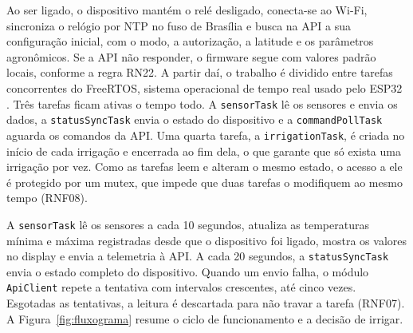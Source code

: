 Ao ser ligado, o dispositivo mantém o relé desligado, conecta-se ao Wi-Fi, sincroniza o relógio por NTP no fuso de Brasília e busca na API a sua configuração inicial, com o modo, a autorização, a latitude e os parâmetros agronômicos. Se a API não responder, o firmware segue com valores padrão locais, conforme a regra RN22. A partir daí, o trabalho é dividido entre tarefas concorrentes do FreeRTOS, sistema operacional de tempo real usado pelo ESP32 \cite{barry2016freertos}. Três tarefas ficam ativas o tempo todo. A \texttt{sensorTask} lê os sensores e envia os dados, a \texttt{statusSyncTask} envia o estado do dispositivo e a \texttt{commandPollTask} aguarda os comandos da API. Uma quarta tarefa, a \texttt{irrigationTask}, é criada no início de cada irrigação e encerrada ao fim dela, o que garante que só exista uma irrigação por vez. Como as tarefas leem e alteram o mesmo estado, o acesso a ele é protegido por um mutex, que impede que duas tarefas o modifiquem ao mesmo tempo (RNF08).

A \texttt{sensorTask} lê os sensores a cada 10 segundos, atualiza as temperaturas mínima e máxima registradas desde que o dispositivo foi ligado, mostra os valores no display e envia a telemetria à API. A cada 20 segundos, a \texttt{statusSyncTask} envia o estado completo do dispositivo. Quando um envio falha, o módulo \texttt{ApiClient} repete a tentativa com intervalos crescentes, até cinco vezes. Esgotadas as tentativas, a leitura é descartada para não travar a tarefa (RNF07). A Figura~\ref{fig:fluxograma} resume o ciclo de funcionamento e a decisão de irrigar.

